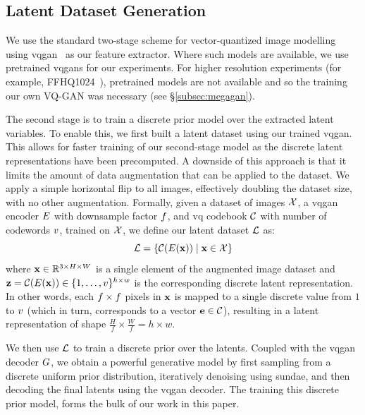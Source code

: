 \subsection{Latent Dataset Generation}
\label{subsec:datasetGen}

We use the standard two-stage scheme for vector-quantized image
modelling~\cite{oord2018neural,razavi2019generating,esser2021taming,bondtaylor2021unleashing}
using \gls{vqgan}~\cite{esser2021taming} as our feature extractor. Where such
models are available, we use pretrained \glspl{vqgan} for our experiments. For
higher resolution experiments (for example,
FFHQ1024~\cite{karras2019stylebased}), pretrained models are not available and
so the training our own VQ-GAN was necessary (see \S\ref{subsec:megagan}). 

The second stage is to train a discrete prior model over the extracted latent variables.
To enable this, we first built a latent dataset using our trained \gls{vqgan}.
This allows for faster training of our second-stage model as the discrete latent
representations have been precomputed. A downside of this approach is that it
limits the amount of data augmentation that can be applied to the dataset. We
apply a simple horizontal flip to all images, effectively doubling the dataset
size, with no other augmentation. Formally, given a dataset of images
$\mathcal{X}$, a \gls{vqgan} encoder $E$ with downsample factor
$f$, and \gls{vq} codebook $\mathcal{C}$ with
number of codewords $v$, trained on $\mathcal{X}$, we define our
latent dataset $\mathcal{L}$ as:
\begin{equation}
    \mathcal{L} = \{\mathcal{C}(E(\mathbf{x})) \mid \mathbf{x} \in \mathcal{X} \}
\end{equation}
where $\mathbf{x} \in \mathbb{R}^{3 \times H \times W}$ is a single element of the
augmented image
dataset and $\mathbf{z} = \mathcal{C}(E(\mathbf{x})) \in \{1, \dots,
v\}^{h \times w}$ is the corresponding discrete latent
representation. In other words, each $f \times f$
pixels in $\mathbf{x}$ is mapped to a single discrete value from $1$ to
$v$ (which in turn, corresponds to a vector $\mathbf{e} \in
\mathcal{C}$),
resulting in a latent representation of shape $\frac{H}{f} \times \frac{W}{f} =
h \times w$.

We then use $\mathcal{L}$ to train a discrete prior over the latents. Coupled
with the \gls{vqgan} decoder $G$, we obtain a powerful generative
model by first sampling from a discrete uniform prior distribution, iteratively
denoising using \gls{sundae}, and then decoding the final latents using the
\gls{vqgan} decoder. The training this discrete prior model, forms the bulk of our
work in this paper.

